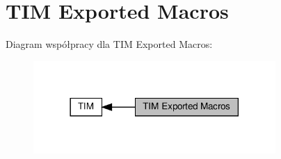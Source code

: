 \hypertarget{group___t_i_m___exported___macros}{}\section{T\+IM Exported Macros}
\label{group___t_i_m___exported___macros}
Diagram współpracy dla T\+IM Exported Macros\+:\nopagebreak
\begin{figure}[H]
\begin{center}
\leavevmode
\includegraphics[width=261pt]{group___t_i_m___exported___macros}
\end{center}
\end{figure}
